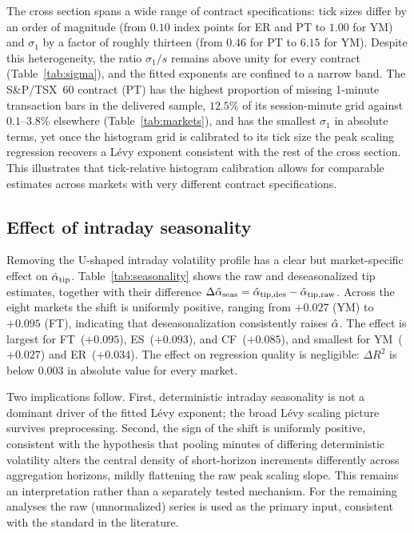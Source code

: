 \documentclass[conference]{IEEEtran}
\begin{document}
The cross section spans a wide range of contract specifications: tick sizes
differ by an order of magnitude (from $0.10$ index points for ER and PT to
$1.00$ for YM) and $\sigma_1$ by a factor of roughly thirteen (from $0.46$
for PT to $6.15$ for YM).
Despite this heterogeneity, the ratio $\sigma_1/s$ remains
above unity for every contract (Table~\ref{tab:sigma}), and the fitted
exponents are confined to a narrow band.
The S\&P/TSX~60 contract (PT) has the highest proportion of missing 1-minute
transaction bars in the delivered sample, $12.5\%$ of its session-minute grid
against $0.1$--$3.8\%$ elsewhere (Table~\ref{tab:markets}), and has the
smallest $\sigma_1$ in absolute terms, yet once the
histogram grid is calibrated to its tick size the peak scaling regression
recovers a Lévy exponent consistent with the rest of the cross section.
This illustrates that tick-relative histogram calibration allows for comparable estimates across markets
with very different contract specifications.


\subsection{Effect of intraday seasonality}
\label{sec:results:seasonality}

Removing the U-shaped intraday volatility profile has a clear but market-specific
effect on $\hat{\alpha}_{\mathrm{tip}}$.
Table~\ref{tab:seasonality} shows the raw and deseasonalized tip estimates,
together with their difference $\Delta\hat{\alpha}_{\mathrm{seas}}
= \hat{\alpha}_{\mathrm{tip,des}} - \hat{\alpha}_{\mathrm{tip,raw}}$.
Across the eight markets the shift is uniformly positive, ranging from $+0.027$ (YM)
to $+0.095$ (FT), indicating that deseasonalization consistently raises $\hat{\alpha}$.
The effect is largest for FT~($+0.095$), ES~($+0.093$), and CF~($+0.085$), and
smallest for YM~($+0.027$) and ER~($+0.034$).
The effect on regression quality is negligible: $\Delta R^2$ is below $0.003$ in
absolute value for every market.

Two implications follow.
First, deterministic intraday seasonality is not a dominant driver of the fitted
Lévy exponent; the broad Lévy scaling picture survives preprocessing.
Second, the sign of the shift is uniformly positive, consistent with the
hypothesis that pooling minutes of differing deterministic volatility alters
the central density of short-horizon increments differently across aggregation
horizons, mildly flattening the raw peak scaling slope. This remains an
interpretation rather than a separately tested mechanism.
For the remaining analyses the raw (unnormalized) series is used as the
primary input, consistent with the standard in the literature.
\end{document}

